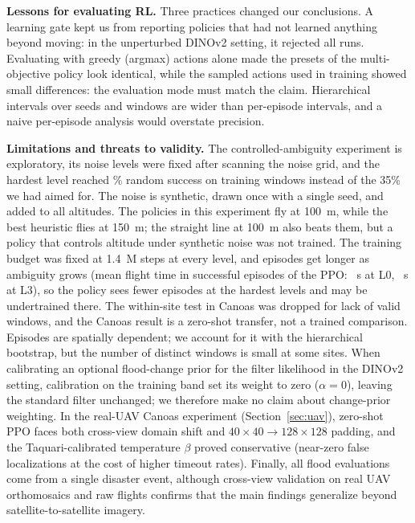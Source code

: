 \textbf{Lessons for evaluating RL.}
Three practices changed our conclusions. A learning gate kept us from reporting policies that had not learned anything beyond moving: in the unperturbed DINOv2 setting, it rejected all \vThreeMatrixRuns{} runs. Evaluating with greedy (argmax) actions alone made the presets of the multi-objective policy look identical, while the sampled actions used in training showed small differences: the evaluation mode must match the claim. Hierarchical intervals over seeds and windows are wider than per-episode intervals, and a naive per-episode analysis would overstate precision.

\textbf{Limitations and threats to validity.}
The controlled-ambiguity experiment is exploratory, its noise levels were fixed after scanning the noise grid, and the hardest level reached \eRandTrainLThree\% random success on training windows instead of the 35\% we had aimed for. The noise is synthetic, drawn once with a single seed, and added to all altitudes. The policies in this experiment fly at 100~m, while the best heuristic flies at 150~m; the straight line at 100~m also beats them, but a policy that controls altitude under synthetic noise was not trained. The training budget was fixed at 1.4~M steps at every level, and episodes get longer as ambiguity grows (mean flight time in successful episodes of the PPO: \eTimePpoLZero~s at L0, \eTimePpoLThree~s at L3), so the policy sees fewer episodes at the hardest levels and may be undertrained there. The within-site test in Canoas was dropped for lack of valid windows, and the Canoas result is a zero-shot transfer, not a trained comparison. Episodes are spatially dependent; we account for it with the hierarchical bootstrap, but the number of distinct windows is small at some sites. When calibrating an optional flood-change prior for the filter likelihood in the DINOv2 setting, calibration on the training band set its weight to zero ($\alpha=0$), leaving the standard filter unchanged; we therefore make no claim about change-prior weighting. In the real-UAV Canoas experiment (Section~\ref{sec:uav}), zero-shot PPO faces both cross-view domain shift and $40\times 40 \to 128\times 128$ padding, and the Taquari-calibrated temperature $\beta$ proved conservative (near-zero false localizations at the cost of higher timeout rates). Finally, all flood evaluations come from a single disaster event, although cross-view validation on real UAV orthomosaics and raw flights confirms that the main findings generalize beyond satellite-to-satellite imagery.
